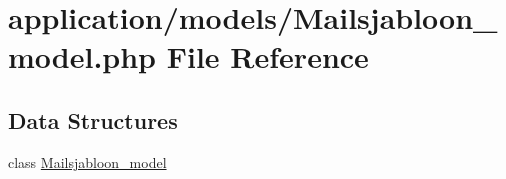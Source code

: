\hypertarget{_mailsjabloon__model_8php}{}\section{application/models/\+Mailsjabloon\+\_\+model.php File Reference}
\label{_mailsjabloon__model_8php}
\subsection*{Data Structures}
\begin{DoxyCompactItemize}
\item 
class \mbox{\hyperlink{class_mailsjabloon__model}{Mailsjabloon\+\_\+model}}
\end{DoxyCompactItemize}
